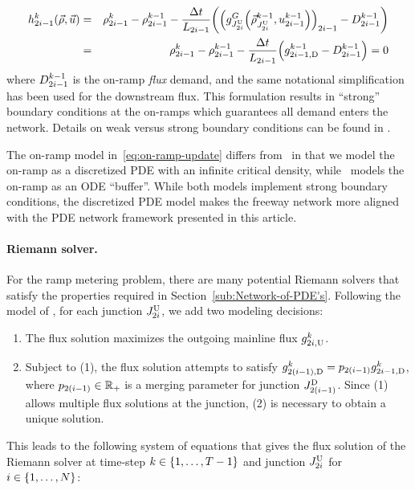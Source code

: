 			\begin{eqnarray}
				\syseq_{2\link-1}^{\tind}(\state,\control) & = & \discrete{2\link-1}{\tind}-\discrete{2\link-1}{\tind-1}-\frac{\Delta t}{\length_{2\link-1}}\left(\left(\god_{\jup{2\link}}\left(\juncstate{\jup{2\link}}{\tind-1},\ramp_{2\link-1}^{\tind-1}\right)\right)_{2\link-1}-\boundaryDemand{2\link-1}{\tind-1}\right)\label{eq:on-ramp-update}\\
				& = & \discrete{2\link-1}{\tind}-\discrete{2\link-1}{\tind-1}-\frac{\Delta t}{\length_{2\link-1}}\left(\fout{2\link-1}{\tind-1}-\boundaryDemand{2\link-1}{\tind-1}\right)=0
			\end{eqnarray}
			where $D_{2i-1}^{k-1}$ is the on-ramp \emph{flux
			}demand, and the same notational simplification has been used for
			the downstream flux. This formulation results in ``strong'' boundary
			conditions at the on-ramps which guarantees all demand enters the network.
			Details on weak versus strong boundary conditions can be found in
			\cite{Monache2013,strub2006weak,work2010traffic}.
						
			The on-ramp model in~\eqref{eq:on-ramp-update} differs from~\cite{Monache2013}
			in that we model the on-ramp as a discretized PDE with an infinite
			critical density, while~\cite{Monache2013} models the on-ramp
			as an ODE ``buffer''. While both models implement strong boundary
			conditions, the discretized PDE model makes the freeway network more
			aligned with the PDE network framework presented in this article.
						
						
			\paragraph{Riemann solver.}
						
			For the ramp metering problem, there are many potential Riemann solvers
			that satisfy the properties required in Section~\ref{sub:Network-of-PDE's}.
			Following the model of \cite{Monache2013}, for each junction $J_{2i}^{\text{U}}$,
			we add two modeling decisions:
			\begin{enumerate}
				\item The flux solution maximizes the outgoing mainline flux $g_{2i,\text{U}}^{k}$.
				\item Subject to (1), the flux solution attempts to satisfy $\fout{2\left(\link-1\right)}{\tind}=p_{2(\link-1)}\fout{2\link-1}{\tind}$,
				where $p_{2(i-1)}\in\mathbb{R}_{+}$ is a merging parameter for
				junction $\jdown{2\left(\link-1\right)}$. Since (1) allows multiple
				flux solutions at the junction, (2) is necessary to obtain a unique
				solution.
			\end{enumerate}
			This leads to the following system of equations that gives the flux
			solution of the Riemann solver at time-step $k\in\intrange 1{\ntime-1}$
			and junction $J_{2i}^{\text{U}}$ for $\link\in\intrange 1{\nlinks}$:
						

